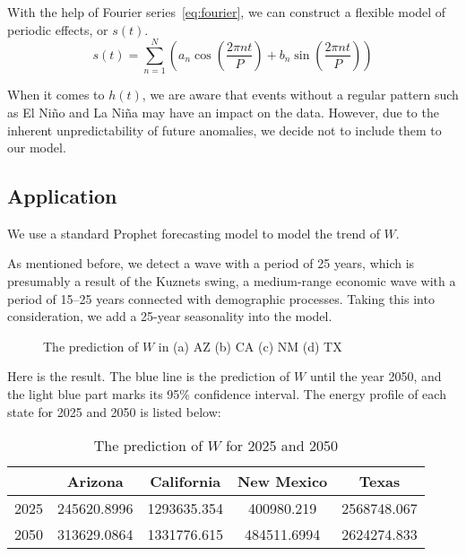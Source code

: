 \documentclass{mcmthesis}
\begin{document}
With the help of Fourier series~\eqref{eq:fourier}, we can construct a flexible model of periodic effects, or $s(t)$.
\begin{equation}  \label{eq:fourier}
s(t) = \sum_{n=1}^{N} \left(a_n \cos\left(\frac{2\pi nt}{P}\right) + b_n \sin\left(\frac{2\pi nt}{P}\right)\right)
\end{equation}

When it comes to $h(t)$, we are aware that events without a regular pattern such as El Niño and La Niña may have an impact on the data. However, due to the inherent unpredictability of future anomalies, we decide not to include them to our model.

\subsection{Application}
We use a standard Prophet forecasting model to model the trend of $W$.

As mentioned before, we detect a wave with a period of 25 years, which is presumably a result of the Kuznets swing, a medium-range economic wave with a period of 15–25 years connected with demographic processes. Taking this into consideration, we add a 25-year seasonality into the model.

\begin{figure}[!h]
\hspace{\fill}
\hspace{\fill}
\hspace{\fill}
    \caption{The prediction of $W$ in (a) AZ (b) CA (c) NM (d) TX }
    \label{fig:w-prediction}
\end{figure}

Here is the result. The blue line is the prediction of $W$ until the year 2050, and the light blue part marks its 95\% confidence interval. The energy profile of each state for 2025 and 2050 is listed below:

\begin{table}[h]
\centering
\begin{tabular}{rcccc}
& Arizona & California & New Mexico & Texas \\ \hline
2025 & 245620.8996 & 1293635.354 & 400980.219 & 2568748.067 \\
2050 & 313629.0864 & 1331776.615 & 484511.6994 & 2624274.833
\end{tabular}
\caption{The prediction of $W$ for 2025 and 2050}
\label{table:w-prediction}
\end{table}
\end{document}
